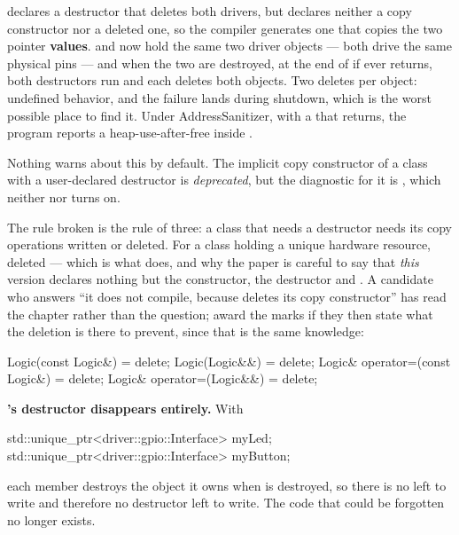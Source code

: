 \noindent{} declares a destructor that deletes both drivers, but declares neither a copy
constructor nor a deleted one, so the compiler generates one that copies the two pointer
\textbf{values}.  and  now hold the same two driver objects --- both drive
the same physical pins --- and when the two are destroyed, at the end of  if 
ever returns, both destructors run and each deletes both objects. Two deletes per object: undefined
behavior, and the failure lands during shutdown, which is the worst possible place to find it. Under
AddressSanitizer, with a  that returns, the program reports a heap-use-after-free inside
.

Nothing warns about this by default. The implicit copy constructor of a class with a user-declared
destructor is \emph{deprecated}, but the diagnostic for it is , which
neither  nor  turns on.

The rule broken is the rule of three: a class that needs a destructor needs its copy operations
written or deleted. For a class holding a unique hardware resource, deleted --- which is what
 does, and why the paper is careful to say that \emph{this} version declares nothing
but the constructor, the destructor and . A candidate who answers ``it does not compile,
because  deletes its copy constructor'' has read the chapter rather than the question;
award the marks if they then state what the deletion is there to prevent, since that is the same
knowledge:

\begin{cppcode}
Logic(const Logic&)            = delete;
Logic(Logic&&)                 = delete;
Logic& operator=(const Logic&) = delete;
Logic& operator=(Logic&&)      = delete;
\end{cppcode}

\textbf{'s destructor disappears entirely.} With

\begin{cppcode}
std::unique_ptr<driver::gpio::Interface> myLed;
std::unique_ptr<driver::gpio::Interface> myButton;
\end{cppcode}

\noindent each member destroys the object it owns when  is destroyed, so there is no
 left to write and therefore no destructor left to write. The code that could be
forgotten no longer exists. 

